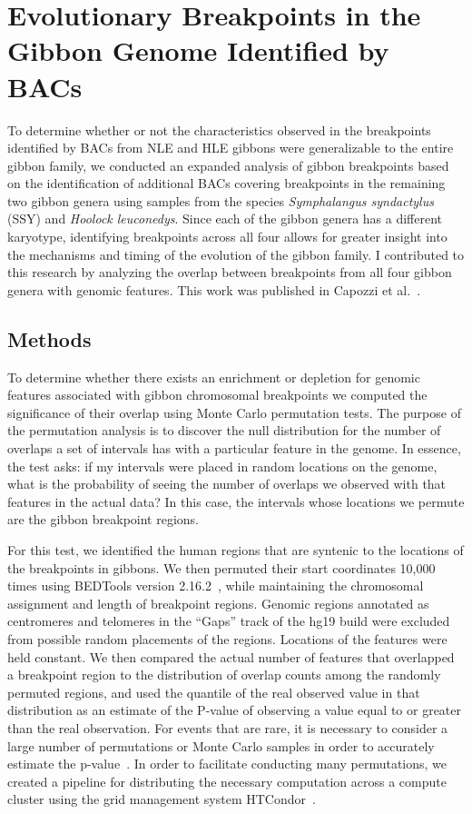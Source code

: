 \section{Evolutionary Breakpoints in the Gibbon Genome  Identified by BACs}\label{gibbon_breakpoint_bac_analysis}

To determine whether or not the characteristics observed in the breakpoints identified by BACs from NLE and HLE gibbons were generalizable to the entire gibbon family, we conducted an expanded analysis of gibbon breakpoints based on the identification of additional BACs covering breakpoints in the remaining two gibbon genera using samples from the species \emph{Symphalangus syndactylus} (SSY) and \emph{Hoolock leuconedys}. Since each of the gibbon genera has a different karyotype, identifying breakpoints across all four allows for greater insight into the mechanisms and timing of the evolution of the gibbon family. I contributed to this research by analyzing the overlap between breakpoints from all four gibbon genera with genomic features. This work was published in Capozzi et al.~\cite{Capozzi:2012bb}.

\subsection{Methods}

To determine whether there exists an enrichment or depletion for genomic features associated with gibbon chromosomal breakpoints we computed the significance of their overlap using Monte Carlo permutation tests. The purpose of the permutation analysis is to discover the null distribution for the number of overlaps a set of intervals has with a particular feature in the genome. In essence, the test asks: if my intervals were placed in random locations on the genome, what is the probability of seeing the number of overlaps we observed with that features in the actual data? In this case, the intervals whose locations we permute are the gibbon breakpoint regions.

For this test, we identified the human regions that are syntenic to the locations of the breakpoints in gibbons. We then permuted their start coordinates 10,000 times using BEDTools version 2.16.2~\cite{Quinlan:2010km}, while maintaining the chromosomal assignment and length of breakpoint regions. Genomic regions annotated as centromeres and telomeres in the ``Gaps'' track of the hg19 build were excluded from possible random placements of the regions. Locations of the features were held constant. We then compared the actual number of features that overlapped a breakpoint region to the distribution of overlap counts among the randomly permuted regions, and used the quantile of the real observed value in that distribution as an estimate of the P-value of observing a value equal to or greater than the real observation. For events that are rare, it is necessary to consider a large number of permutations or Monte Carlo samples in order to accurately estimate the p-value~\cite{Rubinstein:2007:SMC:1349778}. In order to facilitate conducting many permutations, we created a pipeline for distributing the necessary computation across a compute cluster using the grid management system HTCondor~\cite{condor-practice}.

